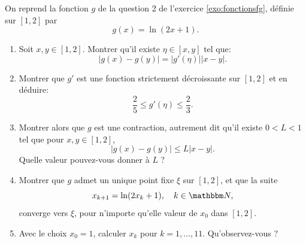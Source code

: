 \medskip

\begin{exercice}
\label{exo:fonctiongPF}

On reprend la fonction $g$ de la question 2 de l'exercice \ref{exo:fonctionsfg}, définie sur $[1,2]$ par 
\[
g(x) = \ln(2x+1).
\]

\begin{enumerate}

\item Soit $x,y\in[1,2]$. Montrer qu'il existe $\eta \in [x,y]$ tel que:
\[
| g(x) - g(y) | = |g'(\eta)| | x - y |.
\]

\item Montrer que $g'$ est une fonction strictement décroissante sur $[1,2]$ et en déduire:
\[
\frac25 \leq g'(\eta) \leq \frac23.
\]

\item Montrer alors que $g$ est une contraction, autrement dit qu'il existe $0 < L < 1$ tel que pour $x,y\in[1,2]$,
\[
| g(x) - g(y) | \leq L | x - y |.
\]
Quelle valeur pouvez-vous donner à $L$ ?

\item Montrer que $g$ admet un unique point fixe $\xi$ sur $[1,2]$, et que la suite 
\[
x_{k+1} = \ln ( 2 x_k + 1), \quad k\in\eN,
\]
converge vers $\xi$, pour n'importe qu'elle valeur de $x_0$ dans $[1,2]$.

\item Avec le choix $x_0 = 1$, calculer $x_k$ pour $k=1,\ldots,11$. Qu'observez-vous ?

\end{enumerate}

\end{exercice}

\medskip

